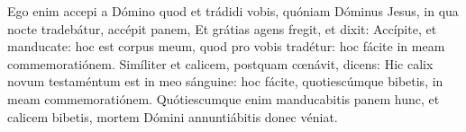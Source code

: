 
Ego enim accepi a Dómino quod et trádidi vobis, quóniam Dóminus Jesus, in qua nocte tradebátur, accépit panem,
Et grátias agens fregit, et dixit: Accípite, et manducate: hoc est corpus meum, quod pro vobis tradétur: hoc fácite in meam commemoratiónem.
Simíliter et calicem, postquam cœnávit, dicens: Hic calix novum testaméntum est in meo sánguine: hoc fácite, quotiescúmque bibetis, in meam commemoratiónem.
Quótiescumque enim manducabitis panem hunc, et calicem bibetis, mortem Dómini annuntiábitis donec véniat.
\par